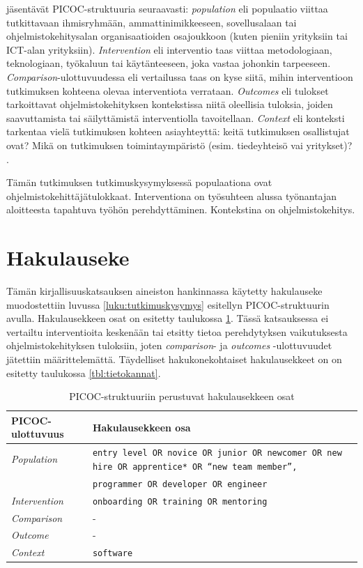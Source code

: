 \documentclass[utf8]{gradu3}
\begin{document}
\textcite{kitchenham-charters-2007} jäsentävät PICOC-struktuuria seuraavasti: \textit{population} eli populaatio viittaa tutkittavaan ihmisryhmään, ammattinimikkeeseen, sovellusalaan tai ohjelmistokehitysalan organisaatioiden osajoukkoon (kuten pieniin yrityksiin tai ICT-alan yrityksiin). \textit{Intervention} eli interventio taas viittaa metodologiaan, teknologiaan, työkaluun tai käytänteeseen, joka vastaa johonkin tarpeeseen. \textit{Comparison}-ulottuvuudessa eli vertailussa taas on kyse siitä, mihin interventioon tutkimuksen kohteena olevaa interventiota verrataan. \textit{Outcomes} eli tulokset tarkoittavat ohjelmistokehityksen kontekstissa niitä oleellisia tuloksia, joiden saavuttamista tai säilyttämistä interventiolla tavoitellaan. \textit{Context} eli konteksti tarkentaa vielä tutkimuksen kohteen asiayhteyttä: keitä tutkimuksen osallistujat ovat? Mikä on tutkimuksen toimintaympäristö (esim. tiedeyhteisö vai yritykset)? \parencite{kitchenham-charters-2007}.

Tämän tutkimuksen tutkimuskysymyksessä populaationa ovat ohjelmistokehittäjätulokkaat. Interventiona on työsuhteen alussa työnantajan aloitteesta tapahtuva työhön perehdyttäminen. Kontekstina on ohjelmistokehitys.

\section{Hakulauseke}

Tämän kirjallisuuskatsauksen aineiston hankinnassa käytetty hakulauseke muodostettiin luvussa  \ref{luku:tutkimuskysymys} esitellyn PICOC-struktuurin avulla. Hakulausekkeen osat on esitetty taulukossa \ref{tbl:picoc-ulottuvuudet}. Tässä katsauksessa ei vertailtu interventioita keskenään tai etsitty tietoa perehdytyksen vaikutuksesta ohjelmistokehityksen tuloksiin, joten \textit{comparison}- ja \textit{outcomes} -ulottuvuudet jätettiin määrittelemättä. Täydelliset hakukonekohtaiset hakulausekkeet on on esitetty taulukossa \ref{tbl:tietokannat}.

\begin{table}[h]
    \footnotesize
    \begin{tabular}{lp{}}
        \toprule
        \textbf{PICOC-ulottuvuus} & \textbf{Hakulausekkeen osa} \\
        \midrule
        \textit{Population} & {\tt entry level OR novice OR junior OR newcomer OR new hire OR apprentice* OR ``new team member'', } \\
        & {\tt programmer OR developer OR engineer} \\
        \midrule
        \textit{Intervention} & {\tt onboarding OR training OR mentoring} \\
        \midrule
        \textit{Comparison} & - \\
        \midrule
        \textit{Outcome} & - \\
        \midrule
        \textit{Context} & {\tt software} \\
        \bottomrule
    \end{tabular}  
    \caption{PICOC-struktuuriin \parencite{kitchenham-charters-2007} perustuvat hakulausekkeen osat}
    \label{tbl:picoc-ulottuvuudet}
\end{table}
\end{document}
